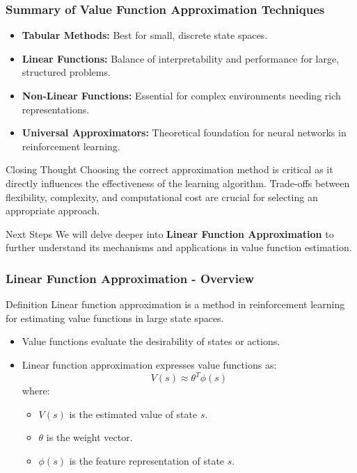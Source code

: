 \documentclass[aspectratio=169]{beamer}
\begin{document}
\begin{frame}[fragile]
    \frametitle{Summary of Value Function Approximation Techniques}
    \begin{itemize}
        \item \textbf{Tabular Methods:} Best for small, discrete state spaces.
        \item \textbf{Linear Functions:} Balance of interpretability and performance for large, structured problems.
        \item \textbf{Non-Linear Functions:} Essential for complex environments needing rich representations.
        \item \textbf{Universal Approximators:} Theoretical foundation for neural networks in reinforcement learning.
    \end{itemize}
    \begin{block}{Closing Thought}
        Choosing the correct approximation method is critical as it directly influences the effectiveness of the learning algorithm. Trade-offs between flexibility, complexity, and computational cost are crucial for selecting an appropriate approach.
    \end{block}
    \begin{block}{Next Steps}
        We will delve deeper into \textbf{Linear Function Approximation} to further understand its mechanisms and applications in value function estimation.
    \end{block}
\end{frame}

\begin{frame}[fragile]
    \frametitle{Linear Function Approximation - Overview}
    \begin{block}{Definition}
        Linear function approximation is a method in reinforcement learning for estimating value functions in large state spaces.
    \end{block}

    \begin{itemize}
        \item Value functions evaluate the desirability of states or actions.
        \item Linear function approximation expresses value functions as:
        \begin{equation}
            V(s) \approx \theta^T \phi(s)
        \end{equation}
        where:
        \begin{itemize}
            \item $V(s)$ is the estimated value of state $s$.
            \item $\theta$ is the weight vector.
            \item $\phi(s)$ is the feature representation of state $s$.
        \end{itemize}
    \end{itemize}
\end{frame}
\end{document}
